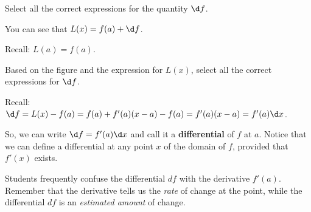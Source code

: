 \documentclass{ximera}
\begin{document}
  \begin{question}
  Select all the correct expressions for the quantity $\d f$.
   \begin{hint}
     You can see that $L(x)=f(a)+\d f$.
    \end{hint}
      \begin{hint}
    Recall: $L(a)=f(a)$.
    \end{hint}
    \begin{selectAll}
         
    \end{selectAll}
   
  \end{question}

 \begin{question}
Based on  the figure and the expression for $L(x)$, select all the correct expressions for $\d f$.
 \begin{hint}
    Recall: $\d f=L(x)-f(a)=f(a)+f'(a)(x-a)-f(a)=f'(a)(x-a)=f'(a)\d x$.
    \end{hint}
      \begin{selectAll}
      \end{selectAll}
  \end{question}
  
So, we can write $\d f=f'(a)\d x$ and call it a \textbf{differential} of $f$ at $a$. Notice that we can define a differential at any point $x$ of the domain of $f$, provided that $f'(x)$ exists. 

Students frequently confuse the differential $df$ with the derivative $f'(a)$.  Remember that the derivative tells us the
\emph{rate} of change at the point, while the differential $df$ is an \emph{estimated amount} of change.
 
\end{document}
